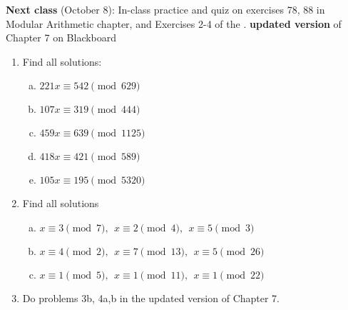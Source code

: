 {\bf Next class} (October 8): In-class practice and quiz on exercises 78, 88 in Modular Arithmetic chapter, and Exercises 2-4 of the .  {\bf updated version}  of Chapter 7  on Blackboard


\begin{enumerate}
\item
Find all solutions:
\begin{enumerate}[(a)]
\item
$221 x \equiv 542 \pmod{629}$
\item
$107x \equiv 319 \pmod{444}$
\item
$459x \equiv 639 \pmod{1125}$
\item
$418 x \equiv 421 \pmod{589}$
\item
$105x \equiv 195 \pmod{5320}$
\end{enumerate}
\item
Find all solutions
\begin{enumerate}[(a)]
\item
$x \equiv 3 \pmod{7},~~x\equiv 2 \pmod{4},~~ x\equiv 5 \pmod{3}$
\item
$x\equiv 4 \pmod{2},~~x \equiv 7 \pmod{13}, ~~ x \equiv 5 \pmod{26}$
\item
$x\equiv 1 \pmod{5},~~ x\equiv 1 \pmod{11},~~x\equiv 1 \pmod{22}$
\end{enumerate}
\item
Do problems 3b, 4a,b in the updated version of Chapter 7.
\end{enumerate}
